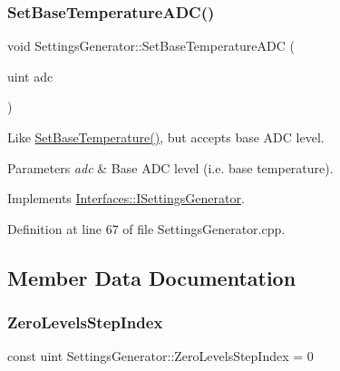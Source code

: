 \mbox{\label{class_settings_generator_a806478b651a98ce128e97c2da385c302}} 
\subsubsection{\texorpdfstring{Set\+Base\+Temperature\+A\+D\+C()}{SetBaseTemperatureADC()}}
{\footnotesize\ttfamily void Settings\+Generator\+::\+Set\+Base\+Temperature\+A\+DC (\begin{DoxyParamCaption}\item[{uint}]{adc }\end{DoxyParamCaption})\hspace{0.3cm}{\ttfamily [virtual]}}



Like \hyperlink{class_settings_generator_aed9e7acb30bfd559b1ac70ceeddd8973}{Set\+Base\+Temperature()}, but accepts base A\+DC level. 


\begin{DoxyParams}{Parameters}
{\em adc} & Base A\+DC level (i.\+e. base temperature). \\
\hline
\end{DoxyParams}


Implements \hyperlink{class_interfaces_1_1_i_settings_generator_af681d36295e95bd52cbfd1bbc3ae8cf9}{Interfaces\+::\+I\+Settings\+Generator}.



Definition at line 67 of file Settings\+Generator.\+cpp.



\subsection{Member Data Documentation}
\mbox{\label{class_settings_generator_a45b535223390381aba891c7fa7e7a29f}} 
\subsubsection{\texorpdfstring{Zero\+Levels\+Step\+Index}{ZeroLevelsStepIndex}}
{\footnotesize\ttfamily const uint Settings\+Generator\+::\+Zero\+Levels\+Step\+Index = 0\hspace{0.3cm}{\ttfamily [static]}}



